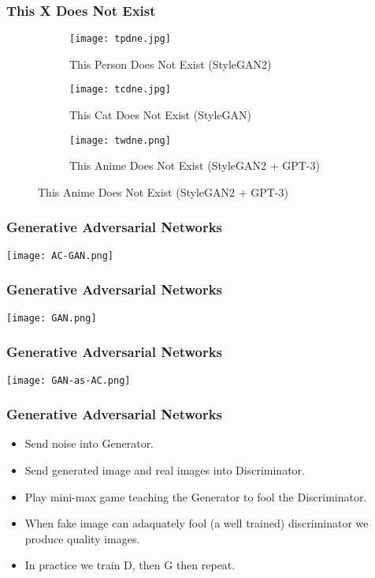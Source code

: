 \begin{frame}
    \frametitle{This X Does Not Exist}
    \vspace{-1em}
    \begin{figure}
        \begin{subfigure}{0.25\textwidth}
            \texttt{[image: tpdne.jpg]}
            \caption{This Person Does Not Exist (StyleGAN2)}
        \end{subfigure}
        \begin{subfigure}{0.25\textwidth}
            \texttt{[image: tcdne.jpg]}
            \caption{This Cat Does Not Exist (StyleGAN)}
        \end{subfigure}
        \begin{subfigure}{0.5\textwidth}
            \texttt{[image: twdne.png]}
            \caption{This Anime Does Not Exist (StyleGAN2 + GPT-3)}
        \end{subfigure}
    \end{figure}
\end{frame}

\begin{frame}
    \frametitle{Generative Adversarial Networks}
    \texttt{[image: AC-GAN.png]}
\end{frame}

\begin{frame}
    \frametitle{Generative Adversarial Networks}
    \center\texttt{[image: GAN.png]}
\end{frame}

\begin{frame}
    \frametitle{Generative Adversarial Networks}
    \center\texttt{[image: GAN-as-AC.png]}
\end{frame}

\begin{frame}
    \frametitle{Generative Adversarial Networks}
    \begin{itemize}
        \item Send noise into Generator.
        \item Send generated image and real images into Discriminator.
        \item Play mini-max game teaching the Generator to fool the
            Discriminator.
        \item When fake image can adaquately fool (a well trained) discriminator
            we produce quality images. 
        \item<2-> In practice we train D, then G then repeat. 
    \end{itemize}
\end{frame}

